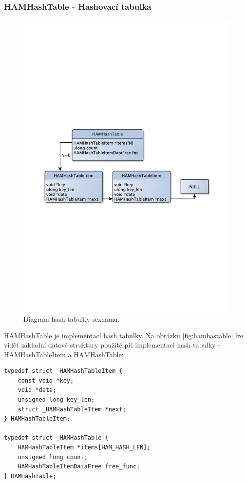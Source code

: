 \subsubsection{HAMHashTable - Hashovací tabulka}



\begin{figure}[h]
\centering
\includegraphics[trim=8cm 8cm 8cm 8cm, scale=0.6]{fig/hash}
\caption{Diagram hash tabulky seznamu.}
\label{fig:hamhashtable}
\end{figure}

HAMHashTable je implementací hash tabulky. Na obrázku \ref{fig:hamhastable} lze vidět základní datové struktury
použíté při implementaci hash tabulky - HAMHashTableItem a HAMHashTable:

\begin{verbatim}
typedef struct _HAMHashTableItem {
	const void *key;
	void *data;
	unsigned long key_len;
	struct _HAMHashTableItem *next;
} HAMHashTableItem;

typedef struct _HAMHashTable {
	HAMHashTableItem *items[HAM_HASH_LEN];
	unsigned long count;
	HAMHashTableItemDataFree free_func;
} HAMHashTable;
\end{verbatim}

